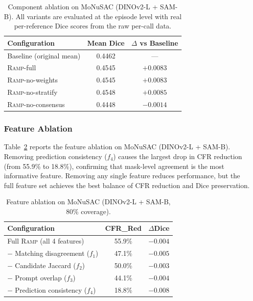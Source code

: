 \documentclass[11pt]{article}
\newcommand{\RAMP}{\textsc{Ramp}}
\begin{document}
\begin{table}[t]
\centering
\caption{Component ablation on MoNuSAC (DINOv2-L + SAM-B).
  All variants are evaluated at the episode level with real per-reference
  Dice scores from the raw per-call data.}
\label{tab:compabl}
\begin{tabular}{lcc}
\toprule
Configuration & Mean Dice & $\Delta$ vs Baseline \\
\midrule
Baseline (original mean) & 0.4462 & --- \\
\RAMP{}-full & 0.4545 & $+0.0083$ \\
\RAMP{}-no-weights & 0.4545 & $+0.0083$ \\
\RAMP{}-no-stratify & 0.4548 & $+0.0085$ \\
\RAMP{}-no-consensus & 0.4448 & $-0.0014$ \\
\bottomrule
\end{tabular}
\end{table}

\subsubsection{Feature Ablation}

Table~\ref{tab:featabl} reports the feature ablation on MoNuSAC
(DINOv2-L + SAM-B). Removing prediction consistency ($f_4$) causes the
largest drop in CFR reduction (from 55.9\% to 18.8\%), confirming that
mask-level agreement is the most informative feature. Removing any single
feature reduces performance, but the full feature set achieves the best
balance of CFR reduction and Dice preservation.

\begin{table}[t]
\centering
\caption{Feature ablation on MoNuSAC (DINOv2-L + SAM-B, 80\% coverage).}
\label{tab:featabl}
\begin{tabular}{lcc}
\toprule
Configuration & CFR\_Red & $\Delta$Dice \\
\midrule
Full \RAMP{} (all 4 features) & 55.9\% & $-0.004$ \\
$-$ Matching disagreement ($f_1$) & 47.1\% & $-0.005$ \\
$-$ Candidate Jaccard ($f_2$) & 50.0\% & $-0.003$ \\
$-$ Prompt overlap ($f_3$) & 44.1\% & $-0.004$ \\
$-$ Prediction consistency ($f_4$) & 18.8\% & $-0.008$ \\
\bottomrule
\end{tabular}
\end{table}
\end{document}
